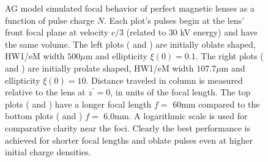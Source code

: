 \begin{figure}
  \centering
  \centerline{
  }
  \centerline{
  }
  \caption[AG model simulated focal behavior of perfect magnetic lenses as a function of pulse charge $N$]{
    AG model simulated focal behavior of perfect magnetic lenses as a function of pulse charge $N$.
    Each plot's pulses begin at the lens' front focal plane at velocity $c/3$ (related to 30 kV energy) and have the same volume.
    The left plots ( and ) are initially oblate shaped, HW1/eM width $ 500 \mu \text{m}$ and ellipticity $ \xi ( 0 ) = 0.1 $.
    The right plots ( and ) are initially prolate shaped, HW1/eM width $ 107.7 \mu \text{m}$ and ellipticity $ \xi ( 0 ) = 10 $.
    Distance traveled in column is measured relative to the lens at $z^{\prime}=0$, in units of the focal length.
    The top plots ( and ) have a longer focal length $f = $ 60mm compared to the bottom plots ( and ) $ f = $ 6.0mm.
    A logarithmic scale is used for comparative clarity near the foci.
    Clearly the best performance is achieved for shorter focal lengths and oblate pulses  even at higher initial charge densities.
  }
  \label{fig:focus_lens_charge}
\end{figure}
